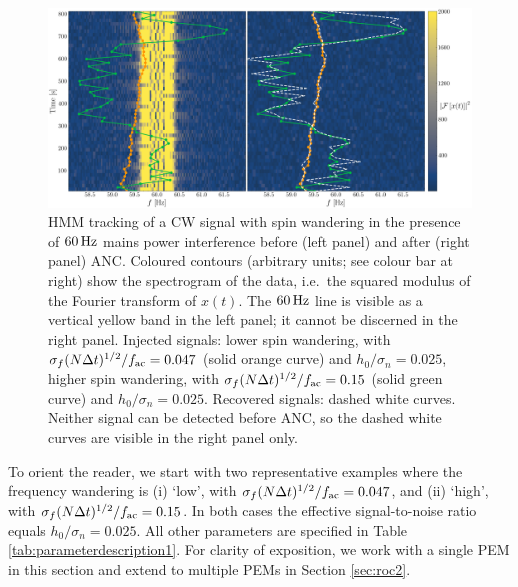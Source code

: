 \documentclass[pra,superscriptaddress,reprint,amsmath,amssymb,nofootinbib]{revtex4-2}
\begin{document}
\begin{figure}
	\begin{center}
			\includegraphics[width=\textwidth]{images/viterbi_tracking_canonical}
		\end{center}
	\caption{\label{frequency tracking before and after1}
			HMM tracking of a CW signal with spin wandering in the presence of $60 \, {\rm Hz}$ mains power interference before (left panel) and after (right panel) ANC. Coloured contours (arbitrary units; see colour bar at right) show the spectrogram of the data, i.e.\ the squared modulus of the Fourier transform of $x(t)$. The $60 \, {\rm Hz}$ line is visible as a vertical yellow band in the left panel; it cannot be discerned in the right panel. Injected signals: lower spin wandering, with $\sigma_f (N \Delta t)^{1/2} / f_{\rm ac} = 0.047$ (solid orange curve) and $h_0 / \sigma_n = 0.025$, higher spin wandering, with $\sigma_f (N \Delta t)^{1/2} / f_{\rm ac} = 0.15$ (solid green curve) and $h_0 / \sigma_n = 0.025$.  Recovered signals: dashed white curves. Neither signal can be detected before ANC, so the dashed white curves are visible in the right panel only.}
\end{figure}
To orient the reader, we start with two representative examples where the frequency wandering is  (i) `low', with $\sigma_f (N \Delta t)^{1/2} / f_{\rm ac} = 0.047$, and (ii) `high', with $\sigma_f (N \Delta t)^{1/2} / f_{\rm ac} = 0.15$. In both cases the effective signal-to-noise ratio equals $h_0 / \sigma_n = 0.025$. All other parameters are specified in Table \ref{tab:parameterdescription1}. For clarity of exposition, we work with a single PEM in this section and extend to multiple PEMs in Section \ref{sec:roc2}. \newline 
\end{document}
